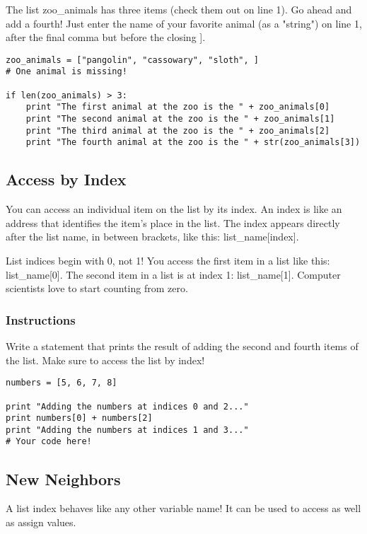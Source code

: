 \documentclass[12pt,a4paper,final,twoside,onecolumn,titlepage]{book}
\begin{document}
The list zoo\_animals has three items (check them out on line 1). Go ahead and add a fourth! Just enter the name of your favorite animal (as a "string") on line 1, after the final comma but before the closing ].

\begin{lstlisting}
zoo_animals = ["pangolin", "cassowary", "sloth", ]
# One animal is missing!

if len(zoo_animals) > 3:
	print "The first animal at the zoo is the " + zoo_animals[0]
	print "The second animal at the zoo is the " + zoo_animals[1]
	print "The third animal at the zoo is the " + zoo_animals[2]
	print "The fourth animal at the zoo is the " + str(zoo_animals[3])
\end{lstlisting}

\subsection{Access by Index}

You can access an individual item on the list by its index. An index is like an address that identifies the item's place in the list. The index appears directly after the list name, in between brackets, like this: list\_name[index].

List indices begin with 0, not 1! You access the first item in a list like this: list\_name[0]. The second item in a list is at index 1: list\_name[1]. Computer scientists love to start counting from zero.
\subsubsection{Instructions}

Write a statement that prints the result of adding the second and fourth items of the list. Make sure to access the list by index!
\begin{lstlisting}
numbers = [5, 6, 7, 8]

print "Adding the numbers at indices 0 and 2..."
print numbers[0] + numbers[2]
print "Adding the numbers at indices 1 and 3..."
# Your code here!

\end{lstlisting}

\subsection{New Neighbors}

A list index behaves like any other variable name! It can be used to access as well as assign values.
\end{document}
